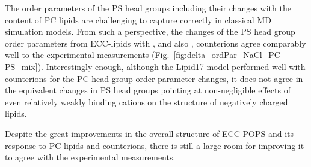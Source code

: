 \documentclass[journal=jpcbfk,manuscript=article]{achemso}
\begin{document}
The order parameters of the PS head groups including their changes with the content of PC lipids
are challenging to capture correctly in classical MD simulation models. \cite{nmrlipids_proj4}
From such a perspective,
the changes of the PS head group order parameters from ECC-lipids 
with , and also , counterions 
agree comparably well to the experimental measurements
(Fig.~\ref{fig:delta_ordPar_NaCl_PC-PS_mix}). 
Interestingly enough, 
although the Lipid17 model performed well with  counterions 
for the PC head group order parameter changes,
it does not agree in the equivalent changes in PS head groups
pointing at non-negligible effects of even relatively weakly binding cations 
on the structure of negatively charged lipids. 

Despite the great improvements in the overall structure of ECC-POPS 
and its response to PC lipids and counterions,
there is still a large room for improving it
to agree with the experimental measurements. 
\end{document}
